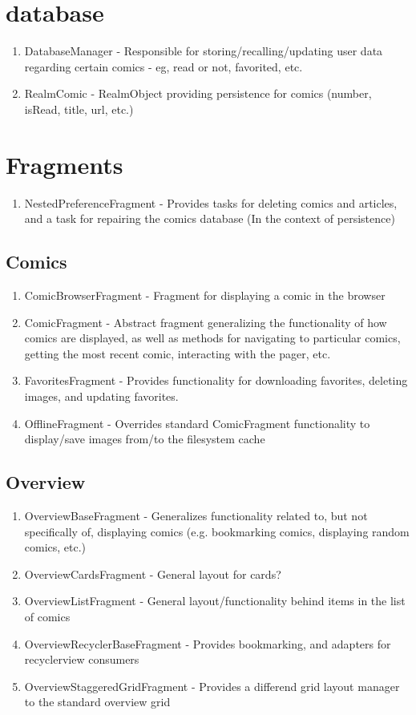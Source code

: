 \documentclass{article}
\begin{document}
\section{database}
\begin{enumerate}
\item DatabaseManager - Responsible for storing/recalling/updating user data regarding certain comics - eg, read or not, favorited, etc.
\item RealmComic - RealmObject providing persistence for comics (number, isRead, title, url, etc.)
\end{enumerate}

\section{Fragments}
\begin{enumerate}
\item NestedPreferenceFragment - Provides tasks for deleting comics and articles, and a task for repairing the comics database (In the context of persistence)
\end{enumerate}
\subsection{Comics}
\begin{enumerate}
\item ComicBrowserFragment - Fragment for displaying a comic in the browser
\item ComicFragment - Abstract fragment generalizing the functionality of how comics are displayed, as well as methods for navigating to particular comics, getting the most recent comic, interacting with the pager, etc.
\item FavoritesFragment - Provides functionality for downloading favorites, deleting images, and updating favorites.
\item OfflineFragment - Overrides standard ComicFragment functionality to display/save images from/to the filesystem cache
\end{enumerate}
\subsection{Overview}
\begin{enumerate}
\item OverviewBaseFragment - Generalizes functionality related to, but not specifically of, displaying comics (e.g. bookmarking comics, displaying random comics, etc.)
\item OverviewCardsFragment - General layout for cards?
\item OverviewListFragment - General layout/functionality behind items in the list of comics
\item OverviewRecyclerBaseFragment - Provides bookmarking, and adapters for recyclerview consumers
\item OverviewStaggeredGridFragment - Provides a differend grid layout manager to the standard overview grid
\end{enumerate}
\end{document}
